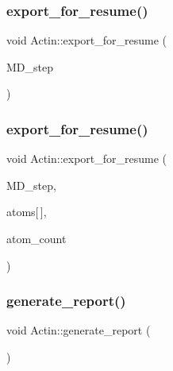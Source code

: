 \mbox{\label{classActin_a5677571921ac483bea992a74ecc393b2}} 
\subsubsection{\texorpdfstring{export\_for\_resume()}{export\_for\_resume()}\hspace{0.1cm}{\footnotesize\ttfamily [1/2]}}
{\footnotesize\ttfamily void Actin\+::export\+\_\+for\+\_\+resume (\begin{DoxyParamCaption}\item[{int}]{M\+D\+\_\+step }\end{DoxyParamCaption})}

\mbox{\label{classActin_a573ffa829c91b99c50974789bb1c013e}} 
\subsubsection{\texorpdfstring{export\_for\_resume()}{export\_for\_resume()}\hspace{0.1cm}{\footnotesize\ttfamily [2/2]}}
{\footnotesize\ttfamily void Actin\+::export\+\_\+for\+\_\+resume (\begin{DoxyParamCaption}\item[{int}]{M\+D\+\_\+step,  }\item[{\mbox{\hyperlink{structMyAtomInfo}{My\+Atom\+Info}}}]{atoms\mbox{[}$\,$\mbox{]},  }\item[{int}]{atom\+\_\+count }\end{DoxyParamCaption})}

\mbox{\label{classActin_a89a64e474276cba5062fb45013deda78}} 
\subsubsection{\texorpdfstring{generate\_report()}{generate\_report()}}
{\footnotesize\ttfamily void Actin\+::generate\+\_\+report (\begin{DoxyParamCaption}{ }\end{DoxyParamCaption})}

